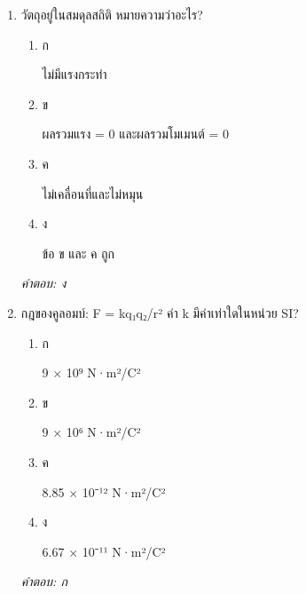 \documentclass[12pt]{article}
\begin{document}
\begin{enumerate}[label=\arabic*., itemsep=0.5\baselineskip, topsep=0.5\baselineskip, leftmargin=*]
\item วัตถุอยู่ในสมดุลสถิติ หมายความว่าอะไร?
\begin{enumerate}[label=\alph*)., itemsep=0.3\baselineskip, topsep=0.3\baselineskip]
\item ก\ 
\begin{minipage}[t]{0.9\linewidth}
\raggedright ไม่มีแรงกระทำ
\end{minipage}
\item ข\ 
\begin{minipage}[t]{0.9\linewidth}
\raggedright ผลรวมแรง = 0 และผลรวมโมเมนต์ = 0
\end{minipage}
\item ค\ 
\begin{minipage}[t]{0.9\linewidth}
\raggedright ไม่เคลื่อนที่และไม่หมุน
\end{minipage}
\item ง\ 
\begin{minipage}[t]{0.9\linewidth}
\raggedright ข้อ ข และ ค ถูก
\end{minipage}
\end{enumerate}
\vspace{-0.3\baselineskip}
\begin{small}
\textit{คำตอบ: ง}
\end{small}

\item กฎของคูลอมบ์: F = kq₁q₂/r² ค่า k มีค่าเท่าใดในหน่วย SI?
\begin{enumerate}[label=\alph*)., itemsep=0.3\baselineskip, topsep=0.3\baselineskip]
\item ก\ 
\begin{minipage}[t]{0.9\linewidth}
\raggedright 9 × 10⁹ N·m²/C²
\end{minipage}
\item ข\ 
\begin{minipage}[t]{0.9\linewidth}
\raggedright 9 × 10⁶ N·m²/C²
\end{minipage}
\item ค\ 
\begin{minipage}[t]{0.9\linewidth}
\raggedright 8.85 × 10⁻¹² N·m²/C²
\end{minipage}
\item ง\ 
\begin{minipage}[t]{0.9\linewidth}
\raggedright 6.67 × 10⁻¹¹ N·m²/C²
\end{minipage}
\end{enumerate}
\vspace{-0.3\baselineskip}
\begin{small}
\textit{คำตอบ: ก}
\end{small}


\end{enumerate}
\end{document}
